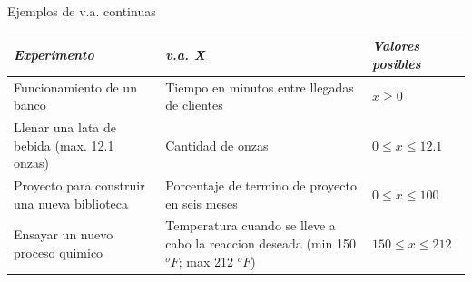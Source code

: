 \documentclass[11pt]{beamer}
\begin{document}
\begin{frame}{Ejemplos de v.a. continuas}
\begin{small}
\begin{tabular}{|m{10em}|m{8em}|m{8em}|}

\hline
 \emph{Experimento} & \emph{v.a. X} &\emph{Valores posibles} \\ \hline
Funcionamiento de un banco & Tiempo en minutos entre llegadas de clientes & $x\geq 0$ \\ \hline
Llenar una lata de bebida (max. 12.1 onzas) & Cantidad de onzas & $0\leq x \leq 12.1$ \\ \hline
Proyecto para construir una nueva biblioteca & Porcentaje de termino de proyecto en seis meses & $0 \leq x \leq 100$ \\ \hline
Ensayar un nuevo proceso quimico & Temperatura cuando se lleve a cabo la reaccion deseada (min 150 $^oF$; max 212 $^oF$) & $150 \leq x \leq 212$  \\ \hline

\end{tabular}
\end{small}
\end{frame}
\end{document}
